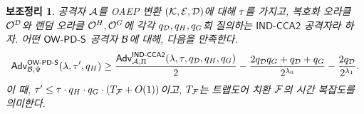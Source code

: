 \documentclass{article}
\newtheorem{lemma}{보조정리}
\theoremstyle{definition}
\begin{document}
\begin{tcolorbox}[colback=white]
	\begin{lemma}
		공격자 $\mathcal{A}$를 OAEP 변환 $(\mathcal{K}, \mathcal{E}, \mathcal{D})$에 대해 $\tau$를 가지고,
		복호화 오라클 $\mathcal{O}^{\mathcal{D}}$와 랜덤 오라클 $\mathcal{O}^{H}, \mathcal{O}^{G}$에
		각각 $q_{\mathcal{D}}, q_{H}, q_{G}$회 질의하는
		$\textsf{IND-CCA2}$ 공격자라 하자. 어떤 $\textsf{OW-PD-S}$ 공격자 $\mathcal{B}$에 대해,
		다음을 만족한다.
		$$
			\textsf{Adv}^{\textsf{OW-PD-S}}_{\mathcal{B}, \Psi}(\lambda, \tau', q_{H})
		  	\ge \frac{\textsf{Adv}^{\textsf{IND-CCA2}}_{\mathcal{A}, \Pi}(\lambda, \tau, q_{\mathcal{D}}, q_{H}, q_{G})}{2}
		   	- \frac{2q_{\mathcal{D}}q_{G} + q_{\mathcal{D}} + q_{G}}{2^{\lambda_0}}
		   	- \frac{2q_{\mathcal{D}}}{2^{\lambda_1}}.
		$$
	  이 때, $\tau' \le \tau \cdot q_{H} \cdot q_{G} \cdot (T_{\mathcal{F}} +
	   O(1))$이고, $T_{\mathcal{F}}$는 트랩도어 치환 $\mathcal{F}$의 시간 복잡도를 의미한다.
	\end{lemma}
\end{tcolorbox}






\end{document}
